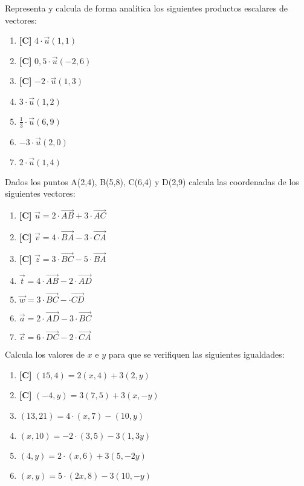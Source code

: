 \Exercicio Representa y calcula de forma analítica los siguientes productos escalares de vectores:
\begin{enumerate}[topsep=0pt]
	\item \textbf{[C]} $ 4 \cdot \overrightarrow{u}(1,1)$
	\item \textbf{[C]} $ 0,5 \cdot \overrightarrow{u}(-2,6)$
	\item \textbf{[C]} $ -2 \cdot \overrightarrow{u}(1,3)$
	
	\item $ 3 \cdot \overrightarrow{u}(1,2)$
	\item $ \frac{1}{3} \cdot \overrightarrow{u}(6,9)$
	\item $ -3 \cdot \overrightarrow{u}(2,0)$
	\item $ 2 \cdot \overrightarrow{u}(1,4)$
\end{enumerate}


\Exercicio Dados los puntos A(2,4), B(5,8), C(6,4) y D(2,9) calcula las coordenadas de los siguientes vectores:

\begin{enumerate}[topsep=0pt]
	\item \textbf{[C]} $ \overrightarrow{u} = 2 \cdot \overrightarrow{AB} + 3 \cdot \overrightarrow{AC} $
	\item \textbf{[C]} $ \overrightarrow{v} = 4 \cdot \overrightarrow{BA} - 3 \cdot \overrightarrow{CA} $
	\item \textbf{[C]} $ \overrightarrow{z} = 3 \cdot \overrightarrow{BC} - 5 \cdot \overrightarrow{BA} $
	
	\item $ \overrightarrow{t} = 4 \cdot \overrightarrow{AB} - 2 \cdot \overrightarrow{AD} $
	\item $ \overrightarrow{w} = 3 \cdot \overrightarrow{BC} - \cdot \overrightarrow{CD} $
	\item $ \overrightarrow{a} = 2 \cdot \overrightarrow{AD} - 3 \cdot \overrightarrow{BC} $
	\item $ \overrightarrow{c} = 6 \cdot \overrightarrow{DC} - 2 \cdot \overrightarrow{CA} $	
\end{enumerate}


\Exercicio Calcula los valores de $x$ e $y$ para que se verifiquen las siguientes igualdades:

\begin{enumerate}[topsep=0pt]
	\item \textbf{[C]} $ (15, 4) = 2(x, 4) + 3(2, y) $
	\item \textbf{[C]} $ (-4, y) = 3(7, 5) + 3(x, -y) $
	
	
	\item $ (13, 21) = 4 \cdot (x, 7) - (10, y) $
	\item $ (x, 10) = -2 \cdot (3, 5) - 3(1, 3y) $
	\item $ (4, y) = 2 \cdot (x, 6) + 3(5, -2y) $
	\item $ (x, y) = 5 \cdot (2x, 8) - 3(10, -y) $
\end{enumerate}


